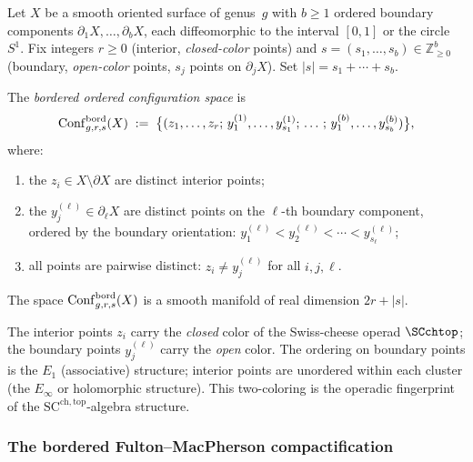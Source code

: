 \begin{definition}
\label{def:bordered-config}
Let $X$ be a smooth oriented surface of genus~$g$ with
$b\ge 1$ ordered boundary components
$\partial_1 X,\dotsc,\partial_b X$, each diffeomorphic to the
interval $[0,1]$ or the circle $S^1$. Fix integers $r\ge 0$
(interior, \emph{closed-color} points) and
$s=(s_1,\dotsc,s_b)\in \mathbb Z_{\ge 0}^b$
(boundary, \emph{open-color} points, $s_j$ points on
$\partial_j X$). Set $|s|=s_1+\cdots+s_b$.

The \emph{bordered ordered configuration space} is
\[
\mathrm{Conf}^{\mathrm{bord}}_{g,r,s}(X)
\;:=\;
\bigl\{
(z_1,\dotsc,z_r;\,y_1^{(1)},\dotsc,y_{s_1}^{(1)};\,\dotsc;\,
y_1^{(b)},\dotsc,y_{s_b}^{(b)})
\bigr\},
\]
where:
\begin{enumerate}[label=(\alph*)]
\item the $z_i\in X\setminus\partial X$ are distinct interior
 points;
\item the $y_j^{(\ell)}\in\partial_\ell X$ are distinct points on
 the $\ell$-th boundary component, ordered by the boundary
 orientation:
 $y_1^{(\ell)}<y_2^{(\ell)}<\cdots<y_{s_\ell}^{(\ell)}$;
\item all points are pairwise distinct:
 $z_i\neq y_j^{(\ell)}$ for all $i,j,\ell$.
\end{enumerate}
The space $\mathrm{Conf}^{\mathrm{bord}}_{g,r,s}(X)$ is a smooth
manifold of real dimension $2r+|s|$.
\end{definition}

\begin{remark}
\label{rem:two-root-types}
The interior points $z_i$ carry the \emph{closed} color of the
Swiss-cheese operad $\SCchtop$; the boundary points $y_j^{(\ell)}$
carry the \emph{open} color. The ordering on boundary points
is the $E_1$ (associative) structure; interior points are
unordered within each cluster (the $E_\infty$ or holomorphic
structure). This two-coloring is the operadic fingerprint of the
$\mathrm{SC}^{\mathrm{ch},\mathrm{top}}$-algebra structure.
\end{remark}

\subsubsection{The bordered Fulton--MacPherson compactification}

